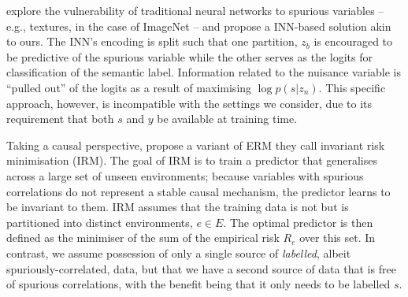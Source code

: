 \citet{JacBehZemBet19} explore the vulnerability of traditional neural networks to spurious
variables -- e.g., textures, in the case of ImageNet \citep{Geir18} -- and propose a \ac{INN}-based
solution akin to ours. The \ac{INN}'s encoding is split such that one partition, $z_b$ is encouraged to
be predictive of the spurious variable while the other serves as the logits for classification of
the semantic label. Information related to the nuisance variable is ``pulled out'' of the logits as
a result of maximising $\log p(s|z_n)$. This specific approach, however, is incompatible with the
settings we consider, due to its requirement that both $s$ and $y$ be available at training time.

Taking a causal perspective, \citet{arjovsky2019invariant} propose a variant of \ac{ERM} they call
invariant risk minimisation (IRM).
%
The goal of IRM is to train a predictor that generalises across a large set of unseen environments;
because variables with spurious correlations do not represent a stable causal mechanism, the
predictor learns to be invariant to them.
%
IRM assumes that the training data is not \emph{\iid{}} but is partitioned into distinct
environments, $e \in E$.
%
The optimal predictor is then defined as the minimiser of the sum of the empirical risk $R_e$ over
this set.
%
In contrast, we assume possession of only a single source of \emph{labelled}, albeit
spuriously-correlated, data, but that we have a second source of data that is free of spurious
correlations, with the benefit being that it only needs to be labelled \emph{\wrt{} $s$}.


